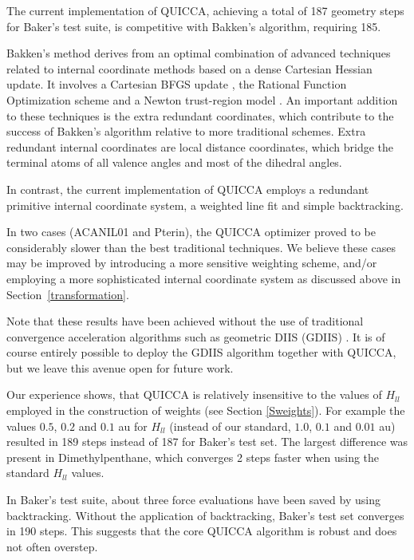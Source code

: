 \documentclass[prl,aps,preprint,showpacs,superbib]{revtex4}
\begin{document}
The current implementation of QUICCA, achieving a total of 187 geometry steps for Baker's test suite, is 
competitive with Bakken's algorithm, requiring 185.  

Bakken's method \cite{bakken} derives from an optimal combination of advanced techniques
related to internal coordinate methods based on a dense Cartesian Hessian update. It involves 
a Cartesian BFGS update \cite{RFletcher}, the Rational Function Optimization scheme \cite{benerji_RFO} 
and a Newton trust-region model \cite{RFletcher}. An important addition to these techniques is the 
extra redundant coordinates, which contribute to the success of Bakken's algorithm relative to more 
traditional schemes. Extra redundant internal coordinates are local distance coordinates, which bridge 
the terminal atoms of all valence angles and most of the dihedral angles.

In contrast, the current implementation of QUICCA employs a redundant primitive internal coordinate 
system, a weighted line fit and simple backtracking.  

In two cases (ACANIL01 and Pterin), the QUICCA optimizer proved to be considerably slower 
than the best traditional techniques.   We believe these cases may be improved by introducing a
more sensitive weighting scheme, and/or employing a more sophisticated internal coordinate
system as discussed above in Section~\ref{transformation}.

Note that these results have been achieved without the use of traditional convergence acceleration 
algorithms such as geometric DIIS (GDIIS) \cite{Pulay_GDIIS,Farkas_GDIIS}.  It is of course entirely 
possible to deploy the GDIIS algorithm together with QUICCA, but we leave this avenue open for future 
work.

Our experience shows, that QUICCA is relatively insensitive to the values of $H_{ll}$ employed 
in the construction of weights (see Section \ref{Sweights}).   For example the values $0.5$, $0.2$ 
and $0.1$ au for $H_{ll}$ (instead of our standard, $1.0$, $0.1$ and $0.01$ au)
resulted in 189 steps instead of 187 for Baker's test set.  The largest difference was present 
in Dimethylpenthane, which converges 2 steps faster when using the standard $H_{ll}$ values. 

In  Baker's test suite, about three force evaluations have been saved by 
using backtracking. Without the application of backtracking, Baker's test set
converges in 190 steps.  This suggests that the core QUICCA algorithm is robust and
does not often overstep.  
\end{document}
